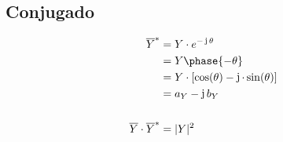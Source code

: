 \documentclass[article, a4paper]{memoir}
\DeclareMathOperator{\ji}{\mathrm{j}}
\begin{document}
\subsection{Conjugado}

\vspace{-7mm}
\begin{align*}
  \overline{Y}^* &= Y\cdot e^{-\ji\theta}\\
                 &= Y\phase{-\theta}\\
                 &= Y \cdot [ \cos(\theta) - \ji\cdot\sin(\theta) ]\\
                 &= a_Y - \ji b_Y\\
  \\
  \overline{Y} \cdot \overline{Y}^* &= |Y|^2
\end{align*}
\end{document}
